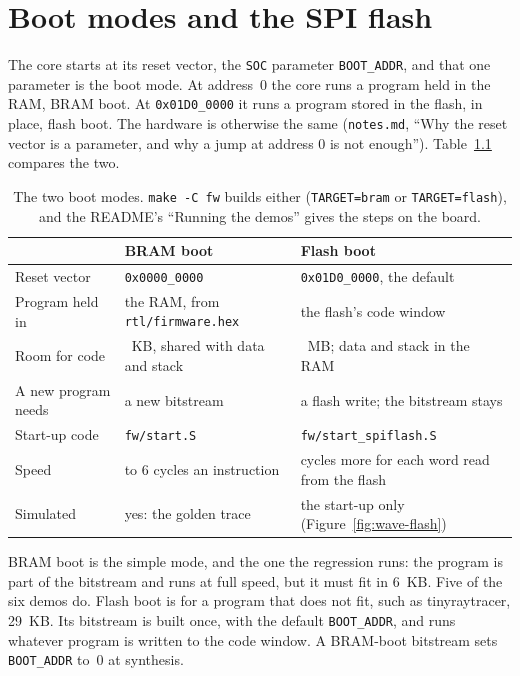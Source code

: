 \documentclass[11pt,a4paper]{report}
\newcommand{\notes}[1]{(\texttt{notes.md}, ``#1'')}
\begin{document}
\chapter{Boot modes and the SPI flash}
\label{ch:flash}

The core starts at its reset vector, the \texttt{SOC} parameter \texttt{BOOT\_ADDR}, and that
one parameter is the boot mode. At address~0 the core runs a program held in the RAM, BRAM
boot. At \texttt{0x01D0\_0000} it runs a program stored in the flash, in place, flash boot.
The hardware is otherwise the same \notes{Why the reset vector is a parameter, and why a jump
at address 0 is not enough}. Table~\ref{tab:boot-modes} compares the two.

\begin{table}[!ht]
  \centering
  \small
  \begin{tabular}{@{}>{\raggedright\arraybackslash}p{2.6cm}
      >{\raggedright\arraybackslash}p{5.6cm}>{\raggedright\arraybackslash}p{5.6cm}@{}}
    \toprule
    & BRAM boot & Flash boot \\
    \midrule
    Reset vector & \texttt{0x0000\_0000} & \texttt{0x01D0\_0000}, the default \\
    \midrule
    Program held in & the RAM, from \texttt{rtl/firmware.hex} & the flash's code window \\
    \midrule
    Room for code & 6~KB, shared with data and stack & 3~MB; data and stack in the RAM \\
    \midrule
    A new program needs & a new bitstream & a flash write; the bitstream stays \\
    \midrule
    Start-up code & \texttt{fw/start.S} & \texttt{fw/start\_spiflash.S} \\
    \midrule
    Speed & 4 to 6 cycles an instruction & 382 cycles more for each word read from the
      flash \\
    \midrule
    Simulated & yes: the golden trace & the start-up only (Figure~\ref{fig:wave-flash}) \\
    \bottomrule
  \end{tabular}
  \caption{The two boot modes. \texttt{make -C fw} builds either (\texttt{TARGET=bram} or
    \texttt{TARGET=flash}), and the README's ``Running the demos'' gives the steps on the board.}
  \label{tab:boot-modes}
\end{table}

BRAM boot is the simple mode, and the one the regression runs: the program is part of the
bitstream and runs at full speed, but it must fit in 6~KB. Five of the six demos do. Flash
boot is for a program that does not fit, such as tinyraytracer, 29~KB. Its bitstream is built
once, with the default \texttt{BOOT\_ADDR}, and runs whatever program is written to the code
window. A BRAM-boot bitstream sets \texttt{BOOT\_ADDR} to~0 at synthesis.
\end{document}
